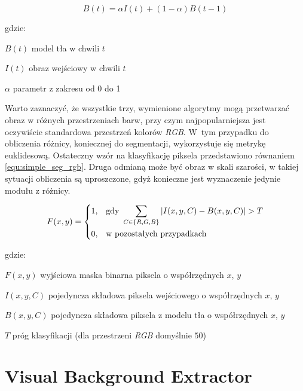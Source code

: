 	\begin{equation}
	    B(t) = \alpha I(t) + (1 - \alpha)B(t-1) 
	\label{equ:adaptive_bg_sub}
	\end{equation}	
	
\noindent gdzie:
\begin{eqwhere}[2cm]
 \item[$B(t)$] model tła w chwili $t$
 \item[$I(t)$] obraz wejściowy w chwili $t$
 \item[$\alpha$] parametr z zakresu od 0 do 1\\
\end{eqwhere}

Warto zaznaczyć, że wszystkie trzy, wymienione algorytmy mogą przetwarzać obraz w różnych przestrzeniach barw, przy czym najpopularniejsza jest oczywiście standardowa przestrzeń kolorów \textit{RGB}. 
W~tym przypadku do obliczenia różnicy, koniecznej do segmentacji, wykorzystuje się metrykę euklidesową. 
Ostateczny wzór na klasyfikację piksela przedstawiono równaniem \ref{equ:simple_seg_rgb}. 
Druga odmianą może być obraz w skali szarości, w takiej sytuacji obliczenia są uproszczone, gdyż konieczne jest wyznaczenie jedynie modułu z różnicy.

    \begin{equation}
        F(x,y) = 
		\begin{dcases}
    		1, & \text{gdy } \sum_{C \in \{R,G,B\}} | I(x,y,C) - B(x,y,C) | > T \\
    		0, & \text{w pozostałych przypadkach} 
		\end{dcases}        
    \label{equ:simple_seg_rgb}
    \end{equation}     

\noindent gdzie:
\begin{eqwhere}[2.5cm]
 \item[$F(x,y)$] wyjściowa maska binarna piksela o współrzędnych $x$, $y$
 \item[$I(x,y,C)$] pojedyncza składowa piksela wejściowego o współrzędnych $x$, $y$
 \item[$B(x,y,C)$] pojedyncza składowa piksela z modelu tła o współrzędnych $x$, $y$
 \item[$T$] próg klasyfikacji (dla przestrzeni \textit{RGB} domyślnie $50$)\\
\end{eqwhere}

\section{Visual Background Extractor}
\label{sec:vibe_teoria}

